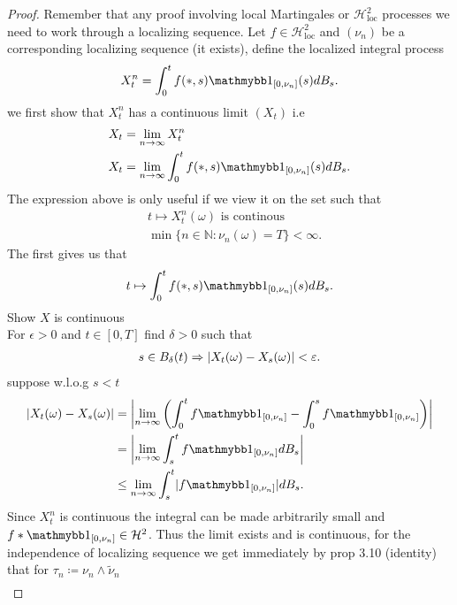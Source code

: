 \begin{proof}
  Remember that any proof involving local Martingales or $\mathcal{H}^2_{\text{loc}}$ processes we need to work through 
  a localizing sequence. Let $f \in  \mathcal{H}_\text{loc}^2$ and $(\nu_n)$ be a corresponding localizing sequence (it exists),
  define the localized integral process 
  \begin{align*}
    X_t^n = \int_0^{t} f(*,s)\cha_{[0,\nu_n]}(s)dB_s 
  .\end{align*}
  we first show that $X_t^n$ has a continuous limit $(X_t)$ i.e 
  \begin{align*}
    &X_t = \lim_{n\to \infty}X_t^n\\
    &X_t = \lim_{n\to \infty} \int_0^{t} f(*,s)\cha_{[0,\nu_n]}(s) dB_s
  .\end{align*}
  The expression above is only useful if we view it on the set such that 
  \begin{align*}
    &t \mapsto X_t^n(\omega ) \text{ is continous} \\
    &\min \{n \in  \mathbb{N} :  \nu_n(\omega ) = T\} <\infty
  .\end{align*}
  The first gives us that 
  \begin{align*}
    t \mapsto \int_0^{t} f(*,s)\cha_{[0,\nu_n]}(s) dB_s
  .\end{align*}
  Show $X$ is continuous \\ 
  For $\epsilon > 0 $ and $t \in  [0,T]$ find $\delta  > 0 $ such that
  \begin{align*}
    s \in  B_\delta(t) \Rightarrow \lvert X_t(\omega ) - X_s(\omega )\rvert < \varepsilon
  .\end{align*}
  suppose  w.l.o.g $s<t$
  \begin{align*}
    \abs{X_t(\omega ) -X_s(\omega )} &= \abs*{\lim_{n\to \infty} \left(  \int_0^{t} f\cha_{[0,\nu_n]}  - \int_0^{s} f\cha_{[0,\nu_n]} \right)  } \\
                                     &=  \abs*{\lim_{n\to \infty} \int_s^{t} f\cha_{[0,\nu_n]} dB_s} \\ 
                                     &\le \lim_{n\to \infty} \int_s^t \abs{f\cha_{[0,\nu_n]}}  dB_s
  .\end{align*}
  Since $X_t^n$ is continuous the integral can be made arbitrarily small and $f*\cha_{[0,\nu_n]} \in  \mathcal{H}^2$.
  Thus the limit exists and is continuous, for the independence of localizing sequence we get immediately by prop 3.10 (identity) that for $\tau_n \coloneqq  \nu_n \land \tilde{\nu }_n $ 
  \begin{align*}

\end{align*}
\end{proof}
